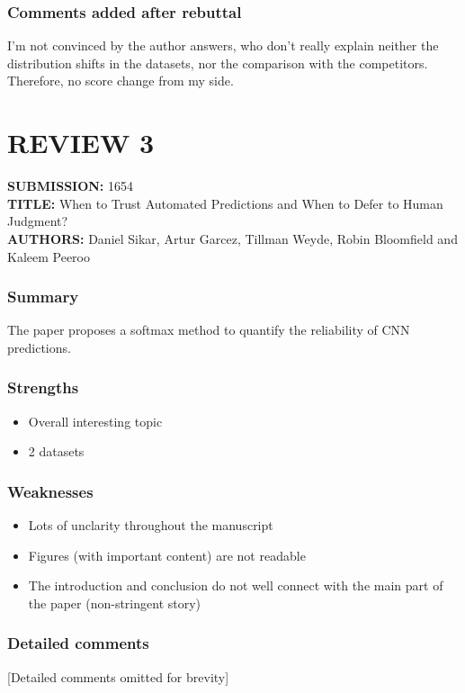 \subsubsection*{Comments added after rebuttal}
I'm not convinced by the author answers, who don't really explain neither the distribution shifts in the datasets, nor the comparison with the competitors. Therefore, no score change from my side.

\section*{REVIEW 3}
\textbf{SUBMISSION:} 1654\\
\textbf{TITLE:} When to Trust Automated Predictions and When to Defer to Human Judgment?\\
\textbf{AUTHORS:} Daniel Sikar, Artur Garcez, Tillman Weyde, Robin Bloomfield and Kaleem Peeroo

\subsubsection*{Summary}
The paper proposes a softmax method to quantify the reliability of CNN predictions.

\subsubsection*{Strengths}
\begin{itemize}
    \item Overall interesting topic
    \item 2 datasets
\end{itemize}

\subsubsection*{Weaknesses}
\begin{itemize}
    \item Lots of unclarity throughout the manuscript
    \item Figures (with important content) are not readable
    \item The introduction and conclusion do not well connect with the main part of the paper (non-stringent story)
\end{itemize}

\subsubsection*{Detailed comments}
[Detailed comments omitted for brevity]

